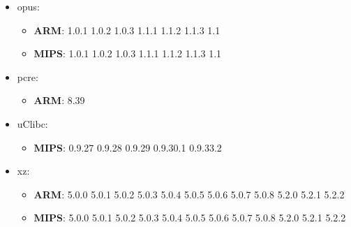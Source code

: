 \documentclass[twocolumn,a4paper]{IEEEtran} %
\begin{document}
\begin{itemize}[noitemsep,topsep=0pt,parsep=0pt,partopsep=0pt]
\item opus:
\begin{itemize}[noitemsep,topsep=0pt,parsep=0pt,partopsep=0pt]
  \item \textbf{ARM}: 1.0.1 1.0.2 1.0.3 1.1.1 1.1.2 1.1.3 1.1
  \item \textbf{MIPS}: 1.0.1 1.0.2 1.0.3 1.1.1 1.1.2 1.1.3 1.1
\end{itemize}

\item pcre:
\begin{itemize}[noitemsep,topsep=0pt,parsep=0pt,partopsep=0pt]
  \item \textbf{ARM}: 8.39
\end{itemize}

\item uClibc:
\begin{itemize}[noitemsep,topsep=0pt,parsep=0pt,partopsep=0pt]
  \item \textbf{MIPS}: 0.9.27 0.9.28 0.9.29 0.9.30.1 0.9.33.2
\end{itemize}

\item xz:
\begin{itemize}[noitemsep,topsep=0pt,parsep=0pt,partopsep=0pt]
  \item \textbf{ARM}: 5.0.0 5.0.1 5.0.2 5.0.3 5.0.4 5.0.5 5.0.6 5.0.7 5.0.8 5.2.0 5.2.1 5.2.2
  \item \textbf{MIPS}: 5.0.0 5.0.1 5.0.2 5.0.3 5.0.4 5.0.5 5.0.6 5.0.7 5.0.8 5.2.0 5.2.1 5.2.2
\end{itemize}
\end{itemize}
\end{document}
